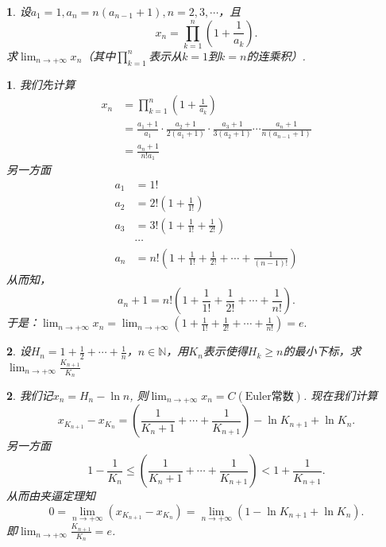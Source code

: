 \documentclass[utf8]{book}
\newtheorem{example}{}[section]             %
\newtheorem{solution}{}
\begin{document}
\begin{example}
设$a_1=1, a_n=n(a_{n-1}+1), n=2,3,\cdots$，且
\[
x_n = \prod_{k=1}^n\left(1+\frac{1}{a_k}\right).
\]求$\displaystyle\lim_{n\to +\infty}x_n$（其中$\displaystyle\prod_{k=1}^n$表示从$k=1$到$k=n$的连乘积）.
\end{example}
\begin{solution}
我们先计算
\begin{equation*}
\begin{split}
x_n &= \prod_{k=1}^n\left(1+\frac{1}{a_k}\right) \\
&=\frac{a_1 +1}{a_1}\cdot\frac{a_2+1}{2(a_1+1)}\cdot\frac{a_3+1}{3(a_2+1)}\cdots\frac{a_n+1}{n(a_{n-1}+1)} \\
&=\frac{a_n+1}{n!a_1}
\end{split}
\end{equation*}
另一方面
\begin{equation*}
\begin{split}
a_1 & = 1! \\
a_2 &= 2!\left(1 + \frac{1}{1!}\right)\\
a_3 &= 3!\left(1+\frac{1}{1!} + \frac{1}{2!}\right)\\
&\cdots \\
a_n &= n!\left(1+ \frac{1}{1!} + \frac{1}{2!}+\cdots+\frac{1}{(n-1)!}\right)
\end{split}
\end{equation*}
从而知，$$a_n+1 = n!\left(1+ \frac{1}{1!} + \frac{1}{2!}+\cdots+\frac{1}{n!}\right).$$
于是：$\displaystyle\lim_{n\to +\infty}x_n = \displaystyle\lim_{n\to +\infty}(1+ \frac{1}{1!} + \frac{1}{2!}+\cdots+\frac{1}{n!})=e.$
\end{solution}
\begin{example}
设$H_n=1+\frac{1}{2}+\cdots+\frac{1}{n}$，$n\in\mathbb{N}$，用$K_n$表示使得$H_k\geq n$的最小下标，求$\displaystyle\lim_{n\to +\infty}\frac{K_{n+1}}{K_n}$
\end{example}
\begin{solution}
我们记$x_n = H_n - \ln{n}$, 则$\displaystyle\lim_{n\to +\infty}x_n=C(\text{Euler常数})$.
现在我们计算
$$x_{K_{n+1}} - x_{K_n} = \left(\frac{1}{K_n+1} + \cdots + \frac{1}{K_{n+1}}\right) -\ln{K_{n+1}} + \ln{K_n}.$$
另一方面
$$1-\frac{1}{K_n}\leq \left(\frac{1}{K_n+1} + \cdots + \frac{1}{K_{n+1}}\right) < 1 + \frac{1}{K_{n+1}}.$$
从而由夹逼定理知
$$0=\displaystyle\lim_{n\to +\infty}(x_{K_{n+1}} - x_{K_n}) = \displaystyle\lim_{n\to +\infty}\left(1 -\ln{K_{n+1}} + \ln{K_n}\right).$$
即$\displaystyle\lim_{n\to +\infty}\frac{K_{n+1}}{K_n}=e$.
\end{solution}
\end{document}

